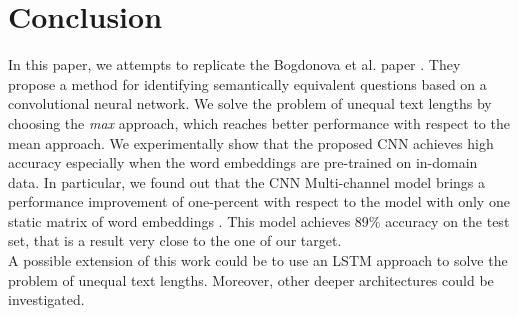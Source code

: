 \documentclass[10pt,twocolumn,letterpaper]{article}
\begin{document}
\section{Conclusion} 

In this paper, we attempts to replicate the Bogdonova et al. paper \cite{bogdanova2015detecting}. They propose a method for identifying semantically equivalent questions based on a convolutional neural network. 
We solve the problem of unequal text lengths by choosing the \emph{max} approach, which reaches better performance with respect to the mean approach. We experimentally show that the proposed CNN achieves high accuracy especially when the word embeddings are pre-trained on in-domain data. In particular, we found out that the CNN Multi-channel model brings a performance improvement of one-percent with respect to the model with only one static matrix of word embeddings . This model achieves 89\% accuracy on the test set, that is a result very close to the one of our target.\\
A possible extension of this work could be to use an LSTM approach to solve the problem of unequal text lengths. Moreover, other deeper architectures could be investigated.




{\small


}
\end{document}
